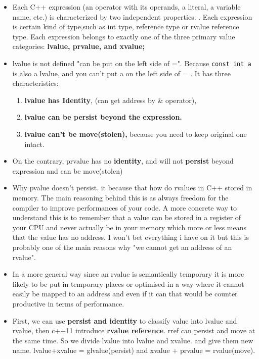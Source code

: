 \documentclass[a4paper,12pt,twoside]{book}
\begin{document}
\begin{itemize}
	\item Each C++ expression (an operator with its operands, a literal, a variable name, etc.) is characterized by two independent properties: . Each expression is certain kind of type,such as int type, reference type or rvalue reference type. Each expression belongs to exactly one of the three primary value categories: \textbf{lvalue, prvalue, and xvalue;} 
	
	\item lvalue is not defined "can be put on the left side of =". Because \texttt{const int a} is also a lvalue, and you can't put a on the left side of = . It has three characteristics:
	\begin{enumerate}
		\item\textbf{lvalue has Identity}, (can get address by \& operator),
		\item \textbf{lvalue can be persist beyond the expression. }
		\item \textbf{lvalue can't be move(stolen),} because you need to keep original one intact.
	\end{enumerate}
	
	\item On the contrary, prvalue has no \textbf{identity}, and will not \textbf{persist} beyond expression and can be move(stolen)
	
	\item Why pvalue doesn't persist. it because that how do rvalues in C++ stored in memory. The main reasoning behind this is as always freedom for the compiler to improve performances of your code. A more concrete way to understand this is to remember that a value can be stored in a register of your CPU and never actually be in your memory which more or less means that the value has no address. I won't bet everything i have on it but this is probably one of the main reasons why "we cannot get an address of an rvalue".
	
	\item In a more general way since an rvalue is semantically temporary it is more likely to be put in temporary places or optimised in a way where it cannot easily be mapped to an address and even if it can that would be counter productive in terms of performance.
	
	\item First, we can use \textbf{persist and identity} to classify value into lvalue and rvalue, then c++11 introduce \textbf{rvalue reference}. rref can persist and move at the same time.  So we divide lvalue into lvalue and xvalue.  and give them new name.  lvalue+xvalue = glvalue(persist)  and xvalue + prvalue = rvalue(move).
	

\end{itemize}
\end{document}
